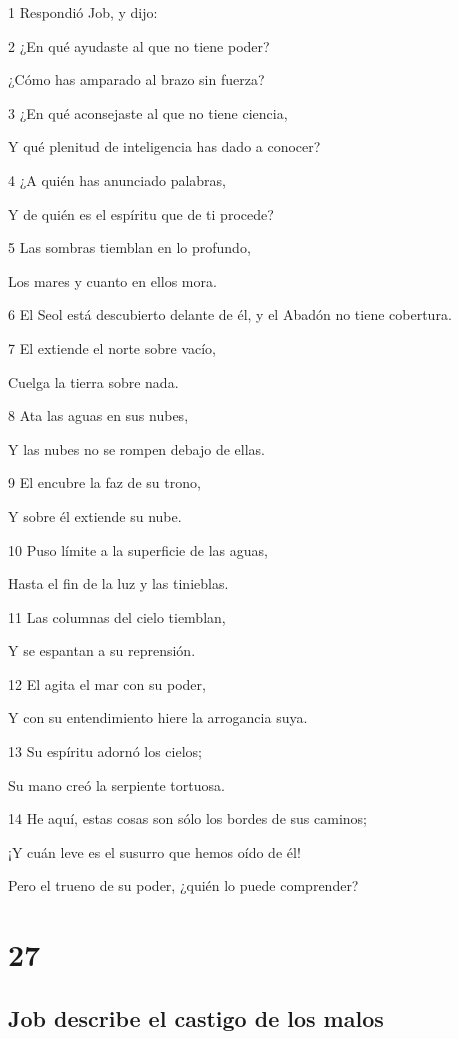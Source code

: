 \par 1 Respondió Job, y dijo:
\par 2 ¿En qué ayudaste al que no tiene poder?
\par ¿Cómo has amparado al brazo sin fuerza?
\par 3 ¿En qué aconsejaste al que no tiene ciencia,
\par Y qué plenitud de inteligencia has dado a conocer?
\par 4 ¿A quién has anunciado palabras,
\par Y de quién es el espíritu que de ti procede?
\par 5 Las sombras tiemblan en lo profundo,
\par Los mares y cuanto en ellos mora.
\par 6 El Seol está descubierto delante de él, y el Abadón no tiene cobertura.
\par 7 El extiende el norte sobre vacío,
\par Cuelga la tierra sobre nada.
\par 8 Ata las aguas en sus nubes,
\par Y las nubes no se rompen debajo de ellas.
\par 9 El encubre la faz de su trono,
\par Y sobre él extiende su nube.
\par 10 Puso límite a la superficie de las aguas,
\par Hasta el fin de la luz y las tinieblas.
\par 11 Las columnas del cielo tiemblan,
\par Y se espantan a su reprensión.
\par 12 El agita el mar con su poder,
\par Y con su entendimiento hiere la arrogancia suya.
\par 13 Su espíritu adornó los cielos;
\par Su mano creó la serpiente tortuosa.
\par 14 He aquí, estas cosas son sólo los bordes de sus caminos;
\par ¡Y cuán leve es el susurro que hemos oído de él!
\par Pero el trueno de su poder, ¿quién lo puede comprender?

\chapter{27}

\section*{Job describe el castigo de los malos}

